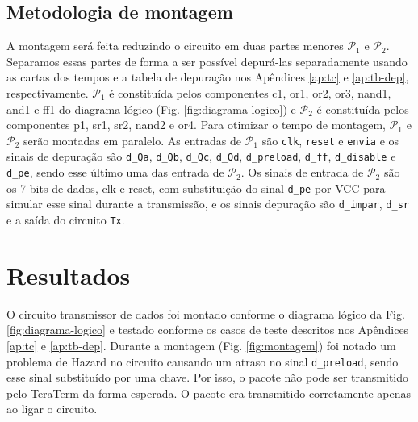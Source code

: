 \documentclass[a4,12pt]{horizon-theme}
\begin{document}
\subsection{Metodologia de montagem}
\label{sec:montagem}

A montagem será feita reduzindo o circuito em duas partes menores $\mathcal{P}_1$ e $\mathcal{P}_2$. Separamos essas partes de forma a ser possível depurá-las separadamente usando as cartas dos tempos e a tabela de depuração nos Apêndices \ref{ap:tc} e \ref{ap:tb-dep}, respectivamente. $\mathcal{P}_1$ é constituída pelos componentes c1, or1, or2, or3, nand1, and1 e ff1 do diagrama lógico (Fig. \ref{fig:diagrama-logico}) e $\mathcal{P}_2$ é constituída pelos componentes p1, sr1, sr2, nand2 e or4. Para otimizar o tempo de montagem, $\mathcal{P}_1$ e $\mathcal{P}_2$ serão montadas em paralelo. As entradas de $\mathcal{P}_1$ são \texttt{clk}, \texttt{reset} e \texttt{envia} e os sinais de depuração são \texttt{d\_Qa}, \texttt{d\_Qb}, \texttt{d\_Qc}, \texttt{d\_Qd}, \texttt{d\_preload}, \texttt{d\_ff}, \texttt{d\_disable} e \texttt{d\_pe}, sendo esse último uma das entrada de $\mathcal{P}_2$. Os sinais de entrada de $\mathcal{P}_2$ são os 7 bits de dados, clk e reset, com substituição do sinal \texttt{d\_pe} por VCC para simular esse sinal durante a transmissão, e os sinais depuração são \texttt{d\_impar}, \texttt{d\_sr} e a saída do circuito \texttt{Tx}.


\section{Resultados}


O circuito transmissor de dados foi montado conforme o diagrama lógico da Fig. \ref{fig:diagrama-logico} e testado conforme os casos de teste descritos nos Apêndices \ref{ap:tc} e \ref{ap:tb-dep}. Durante a montagem (Fig. \ref{fig:montagem}) foi notado um problema de Hazard no circuito causando um atraso no sinal \texttt{d\_preload}, sendo esse sinal substituído por uma chave. Por isso, o pacote não pode ser transmitido pelo TeraTerm da forma esperada. O pacote era transmitido corretamente apenas ao ligar o circuito.
\end{document}
